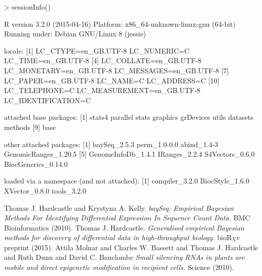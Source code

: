 \documentclass[a4paper]{article}
\begin{document}
\begin{Schunk}
\begin{Sinput}
> sessionInfo()
\end{Sinput}
\begin{Soutput}
R version 3.2.0 (2015-04-16)
Platform: x86_64-unknown-linux-gnu (64-bit)
Running under: Debian GNU/Linux 8 (jessie)

locale:
 [1] LC_CTYPE=en_GB.UTF-8       LC_NUMERIC=C               LC_TIME=en_GB.UTF-8       
 [4] LC_COLLATE=en_GB.UTF-8     LC_MONETARY=en_GB.UTF-8    LC_MESSAGES=en_GB.UTF-8   
 [7] LC_PAPER=en_GB.UTF-8       LC_NAME=C                  LC_ADDRESS=C              
[10] LC_TELEPHONE=C             LC_MEASUREMENT=en_GB.UTF-8 LC_IDENTIFICATION=C       

attached base packages:
[1] stats4    parallel  stats     graphics  grDevices utils     datasets  methods  
[9] base     

other attached packages:
[1] baySeq_2.5.3         perm_1.0-0.0         abind_1.4-3          GenomicRanges_1.20.5
[5] GenomeInfoDb_1.4.1   IRanges_2.2.4        S4Vectors_0.6.0      BiocGenerics_0.14.0 

loaded via a namespace (and not attached):
[1] compiler_3.2.0  BiocStyle_1.6.0 XVector_0.8.0   tools_3.2.0    
\end{Soutput}
\end{Schunk}


\begin{thebibliography}{99}
 Thomas J. Hardcastle and Krystyna A. Kelly. \textsl{baySeq: Empirical Bayesian Methods For Identifying Differential Expression In Sequence Count Data.} BMC Bioinformatics (2010).
 Thomas J. Hardcastle. \textsl{Generalised empirical Bayesian methods for discovery of differential data in high-throughput biology.} bioR$\chi$v preprint (2015).
 Attila Molnar and Charles W. Bassett and Thomas J. Hardcastle and Ruth Dunn and David C. Bauclombe \textsl{Small silencing RNAs in plants are mobile and direct epigenetic modification in recipient cells.} Science (2010).
\end{thebibliography}
\end{document}
